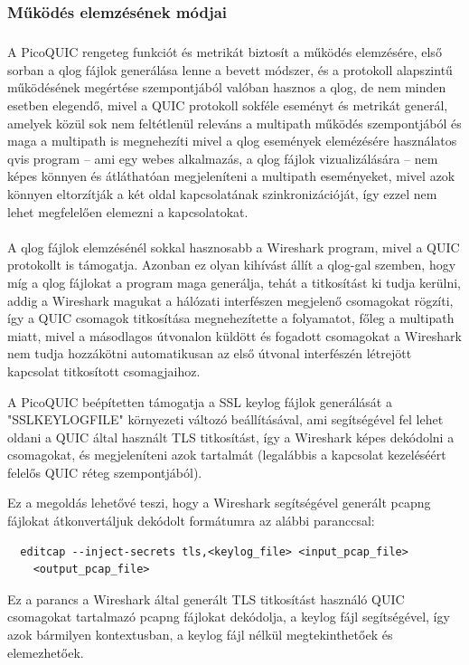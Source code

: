\documentclass[a4paper,oneside]{article}
\begin{document}
\subsubsection{Működés elemzésének módjai}

\subparagraph{}

A PicoQUIC rengeteg funkciót és metrikát biztosít a működés elemzésére, 
első sorban a qlog fájlok generálása lenne a bevett módszer, és
a protokoll alapszintű működésének megértése szempontjából valóban hasznos 
a qlog, de nem minden esetben elegendő, mivel a QUIC protokoll
sokféle eseményt és metrikát generál, amelyek közül sok nem feltétlenül releváns a 
multipath működés szempontjából és maga a multipath is megnehezíti mivel a qlog események 
elemézésére használatos qvis program\cite{qvis} – ami egy webes alkalmazás, a qlog 
fájlok vizualizálására – nem képes könnyen és átláthatóan megjeleníteni a multipath 
eseményeket, mivel azok könnyen eltorzítják a két oldal kapcsolatának 
szinkronizációját, így ezzel nem lehet megfelelően elemezni a kapcsolatokat.

\paragraph{}
A qlog fájlok elemzésénél sokkal hasznosabb a Wireshark program, mivel
a QUIC protokollt is támogatja.
Azonban ez olyan kihívást állít a qlog-gal szemben, hogy míg a 
qlog fájlokat a program maga generálja, tehát a titkosítást ki tudja kerülni, 
addig a Wireshark magukat a hálózati interfészen megjelenő csomagokat rögzíti, 
így a QUIC csomagok titkosítása megnehezítette a folyamatot, főleg a multipath 
miatt, mivel a másodlagos útvonalon küldött és fogadott csomagokat a Wireshark 
nem tudja hozzákötni automatikusan az első útvonal interfészén létrejött kapcsolat titkosított csomagjaihoz.

A PicoQUIC beépítetten támogatja a SSL keylog fájlok generálását a "SSLKEYLOGFILE" környezeti változó 
beállításával, ami segítségével fel lehet oldani a QUIC által használt TLS titkosítást,
így a Wireshark képes dekódolni a csomagokat, és megjeleníteni azok 
tartalmát (legalábbis a kapcsolat kezeléséért felelős QUIC réteg szempontjából).

Ez a megoldás lehetővé teszi, hogy a Wireshark segítségével generált 
pcapng fájlokat átkonvertáljuk dekódolt formátumra az alábbi paranccsal:
\begin{verbatim}
  editcap --inject-secrets tls,<keylog_file> <input_pcap_file> 
    <output_pcap_file>
\end{verbatim}
Ez a parancs a Wireshark által generált TLS titkosítást használó QUIC 
csomagokat tartalmazó pcapng fájlokat dekódolja, a keylog fájl segítségével, így azok bármilyen kontextusban, a keylog fájl nélkül megtekinthetőek
és elemezhetőek.
\end{document}

